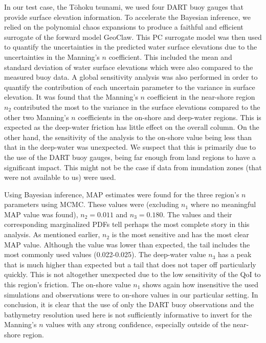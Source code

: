 \documentclass[review,12pt]{elsarticle}
\newcommand{\geoclaw}{{\sc GeoClaw}\xspace}
\newcommand{\tohoku}{T\={o}hoku\xspace}
\begin{document}
In our test case, the \tohoku tsunami, we used four DART buoy gauges that
provide  surface elevation information.  To accelerate the Bayesian inference,
we relied on the polynomial  chaos expansions to produce a faithful and
efficient surrogate of the forward model \geoclaw.  This PC surrogate model was
then used to quantify the uncertainties in the predicted water surface
elevations due to the uncertainties in the Manning's $n$ coefficient.  This
included the mean and standard deviation of water surface elevations which were
also compared to the measured buoy data.  A global sensitivity analysis was also
performed in order to quantify the contribution of each uncertain parameter to
the variance in surface elevation.  It was found that the Manning's $n$
coefficient in the near-shore region $n_2$ contributed the most to the variance
in the surface elevations compared to the other two Manning's $n$ coefficients
in the on-shore and deep-water regions.  This is expected as the deep-water
friction has little effect on the overall column.  On the other hand, the
sensitivity of the analysis to the on-shore value being less than that in the
deep-water was unexpected. We suspect that this is primarily due to the use of the
DART buoy gauges, being far enough from land regions to have a significant impact. 
This might not be the case if data from inundation zones (that
were not available to us) were used. 

Using Bayesian inference, MAP estimates were found for the three region's $n$
parameters using MCMC.  These values were (excluding $n_1$ where no meaningful
MAP value was found), $n_2=0.011$ and $n_3=0.180$.  The values and their
corresponding marginalized PDFs tell perhaps the most
complete story in this analysis.  As mentioned earlier, $n_2$ is the most
sensitive and has the most clear MAP value.  Although the value was lower than
expected, the tail includes the most commonly used values (0.022-0.025).  The
deep-water value $n_3$ has a peak that is much higher than expected but a tail
that does not taper off particularly quickly.  This is not altogether unexpected
due to the low sensitivity of the QoI to this region's friction.  The
on-shore value $n_1$ shows again how insensitive the used simulations and
observations were to on-shore values in our particular setting.  
In conclusion, it is clear that the use of only the DART buoy observations and the 
bathymetry resolution used here is not sufficiently informative to invert for the 
Manning's $n$ values with any strong confidence, especially outside of the near-shore region.
\end{document}
